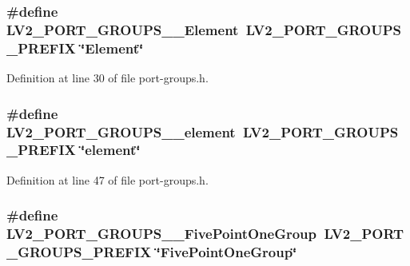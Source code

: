 \subsubsection[{\texorpdfstring{L\+V2\+\_\+\+P\+O\+R\+T\+\_\+\+G\+R\+O\+U\+P\+S\+\_\+\+\_\+\+Element}{LV2_PORT_GROUPS__Element}}]{\setlength{\rightskip}{0pt plus 5cm}\#define L\+V2\+\_\+\+P\+O\+R\+T\+\_\+\+G\+R\+O\+U\+P\+S\+\_\+\+\_\+\+Element~{\bf L\+V2\+\_\+\+P\+O\+R\+T\+\_\+\+G\+R\+O\+U\+P\+S\+\_\+\+P\+R\+E\+F\+IX} \char`\"{}Element\char`\"{}}\hypertarget{port-groups_8h_a9f0c10afc7f7f58d28e8d29353fc6e4e}{}\label{port-groups_8h_a9f0c10afc7f7f58d28e8d29353fc6e4e}


Definition at line 30 of file port-\/groups.\+h.

\subsubsection[{\texorpdfstring{L\+V2\+\_\+\+P\+O\+R\+T\+\_\+\+G\+R\+O\+U\+P\+S\+\_\+\+\_\+element}{LV2_PORT_GROUPS__element}}]{\setlength{\rightskip}{0pt plus 5cm}\#define L\+V2\+\_\+\+P\+O\+R\+T\+\_\+\+G\+R\+O\+U\+P\+S\+\_\+\+\_\+element~{\bf L\+V2\+\_\+\+P\+O\+R\+T\+\_\+\+G\+R\+O\+U\+P\+S\+\_\+\+P\+R\+E\+F\+IX} \char`\"{}element\char`\"{}}\hypertarget{port-groups_8h_a3925b0c3eaa7e3b8e0ae892ba45af7d4}{}\label{port-groups_8h_a3925b0c3eaa7e3b8e0ae892ba45af7d4}


Definition at line 47 of file port-\/groups.\+h.

\subsubsection[{\texorpdfstring{L\+V2\+\_\+\+P\+O\+R\+T\+\_\+\+G\+R\+O\+U\+P\+S\+\_\+\+\_\+\+Five\+Point\+One\+Group}{LV2_PORT_GROUPS__FivePointOneGroup}}]{\setlength{\rightskip}{0pt plus 5cm}\#define L\+V2\+\_\+\+P\+O\+R\+T\+\_\+\+G\+R\+O\+U\+P\+S\+\_\+\+\_\+\+Five\+Point\+One\+Group~{\bf L\+V2\+\_\+\+P\+O\+R\+T\+\_\+\+G\+R\+O\+U\+P\+S\+\_\+\+P\+R\+E\+F\+IX} \char`\"{}Five\+Point\+One\+Group\char`\"{}}\hypertarget{port-groups_8h_ac1af4c3e441a74e2eb9f127419f86fed}{}\label{port-groups_8h_ac1af4c3e441a74e2eb9f127419f86fed}


